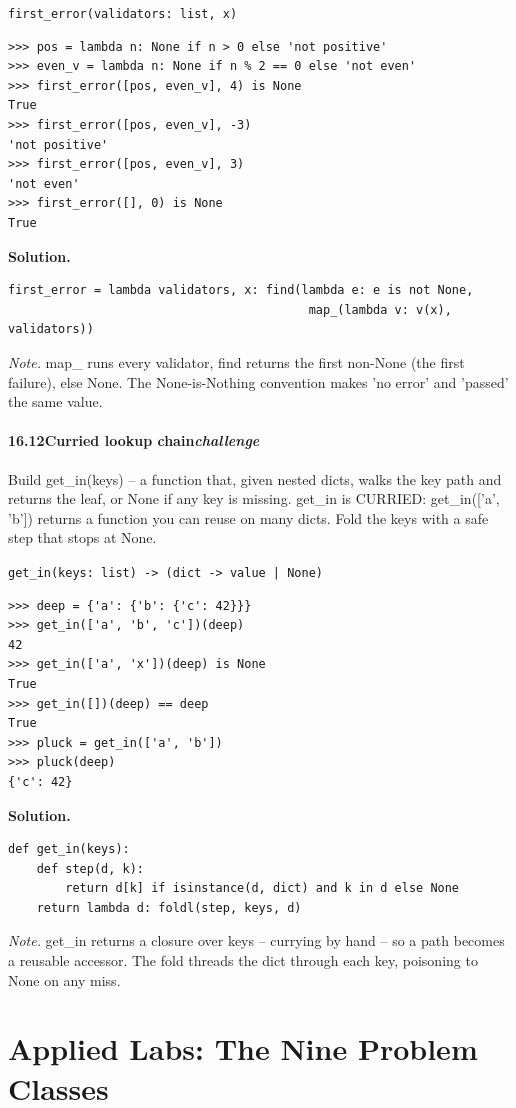 \documentclass[10pt,letterpaper]{book}
\begin{document}
\noindent\texttt{first\_error(validators: list, x)}
\begin{lstlisting}[style=ex]
>>> pos = lambda n: None if n > 0 else 'not positive'
>>> even_v = lambda n: None if n % 2 == 0 else 'not even'
>>> first_error([pos, even_v], 4) is None
True
>>> first_error([pos, even_v], -3)
'not positive'
>>> first_error([pos, even_v], 3)
'not even'
>>> first_error([], 0) is None
True
\end{lstlisting}
\noindent\textbf{Solution.}
\begin{lstlisting}[style=code]
first_error = lambda validators, x: find(lambda e: e is not None,
                                          map_(lambda v: v(x), validators))
\end{lstlisting}
\noindent\textit{Note.} map\_ runs every validator, find returns the first non-None (the first failure), else None. The None-is-Nothing convention makes 'no error' and 'passed' the same value.

\subsection*{16.12\quad Curried lookup chain\hfill\textnormal{\textit{challenge}}}
Build get\_in(keys) -- a function that, given nested dicts, walks the key path and returns the leaf, or None if any key is missing. get\_in is CURRIED: get\_in(['a', 'b']) returns a function you can reuse on many dicts. Fold the keys with a safe step that stops at None.

\noindent\texttt{get\_in(keys: list) -> (dict -> value | None)}
\begin{lstlisting}[style=ex]
>>> deep = {'a': {'b': {'c': 42}}}
>>> get_in(['a', 'b', 'c'])(deep)
42
>>> get_in(['a', 'x'])(deep) is None
True
>>> get_in([])(deep) == deep
True
>>> pluck = get_in(['a', 'b'])
>>> pluck(deep)
{'c': 42}
\end{lstlisting}
\noindent\textbf{Solution.}
\begin{lstlisting}[style=code]
def get_in(keys):
    def step(d, k):
        return d[k] if isinstance(d, dict) and k in d else None
    return lambda d: foldl(step, keys, d)
\end{lstlisting}
\noindent\textit{Note.} get\_in returns a closure over keys -- currying by hand -- so a path becomes a reusable accessor. The fold threads the dict through each key, poisoning to None on any miss.

\clearpage
\part{Applied Labs: The Nine Problem Classes}
\end{document}
